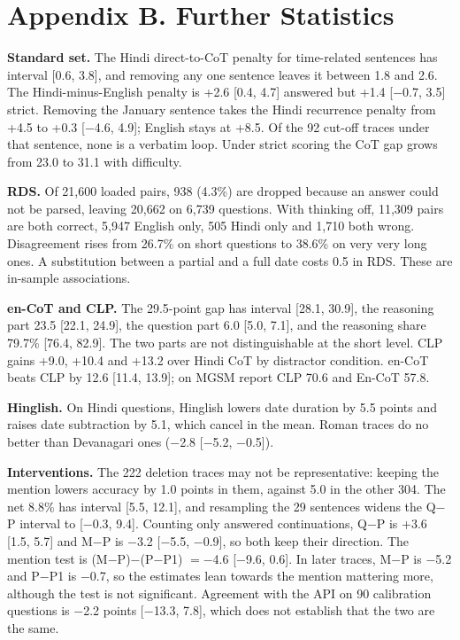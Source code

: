 \section*{Appendix B. Further Statistics}

\noindent\textbf{Standard set.} The Hindi direct-to-CoT penalty for time-related sentences has interval [0.6, 3.8], and removing any one sentence leaves it between 1.8 and 2.6. The Hindi-minus-English penalty is +2.6 [0.4, 4.7] answered but +1.4 [$-$0.7, 3.5] strict. Removing the January sentence takes the Hindi recurrence penalty from +4.5 to +0.3 [$-$4.6, 4.9]; English stays at +8.5. Of the 92 cut-off traces under that sentence, none is a verbatim loop. Under strict scoring the CoT gap grows from 23.0 to 31.1 with difficulty.

\smallskip
\noindent\textbf{RDS.} Of 21,600 loaded pairs, 938 (4.3\%) are dropped because an answer could not be parsed, leaving 20,662 on 6,739 questions. With thinking off, 11,309 pairs are both correct, 5,947 English only, 505 Hindi only and 1,710 both wrong. Disagreement rises from 26.7\% on short questions to 38.6\% on very very long ones. A substitution between a partial and a full date costs 0.5 in RDS. These are in-sample associations.

\smallskip
\noindent\textbf{en-CoT and CLP.} The 29.5-point gap has interval [28.1, 30.9], the reasoning part 23.5 [22.1, 24.9], the question part 6.0 [5.0, 7.1], and the reasoning share 79.7\% [76.4, 82.9]. The two parts are not distinguishable at the short level. CLP gains +9.0, +10.4 and +13.2 over Hindi CoT by distractor condition. en-CoT beats CLP by 12.6 [11.4, 13.9]; on MGSM \citeauthor{qin-etal-2023-cross} report CLP 70.6 and En-CoT 57.8.

\smallskip
\noindent\textbf{Hinglish.} On Hindi questions, Hinglish lowers date duration by 5.5 points and raises date subtraction by 5.1, which cancel in the mean. Roman traces do no better than Devanagari ones ($-$2.8 [$-$5.2, $-$0.5]).

\smallskip
\noindent\textbf{Interventions.} The 222 deletion traces may not be representative: keeping the mention lowers accuracy by 1.0 points in them, against 5.0 in the other 304. The net 8.8\% has interval [5.5, 12.1], and resampling the 29 sentences widens the Q$-$P interval to [$-$0.3, 9.4]. Counting only answered continuations, Q$-$P is +3.6 [1.5, 5.7] and M$-$P is $-$3.2 [$-$5.5, $-$0.9], so both keep their direction. The mention test is (M$-$P)$-$(P$-$P1) $=-$4.6 [$-$9.6, 0.6]. In later traces, M$-$P is $-$5.2 and P$-$P1 is $-$0.7, so the estimates lean towards the mention mattering more, although the test is not significant. Agreement with the API on 90 calibration questions is $-$2.2 points [$-$13.3, 7.8], which does not establish that the two are the same.


